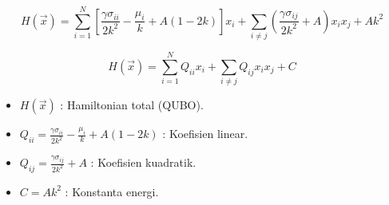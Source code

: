 \begin{equation}
    H(\vec{x}) = \sum_{i=1}^N \left[ \frac{\gamma \sigma_{ii}}{2k^2} - \frac{\mu_i}{k} + A(1 - 2k) \right] x_i + \sum_{i \ne j} \left( \frac{\gamma \sigma_{ij}}{2k^2} + A \right) x_i x_j + Ak^2
\end{equation}

\begin{equation}
    H(\vec{x}) = \sum_{i=1}^N Q_{ii} x_i + \sum_{i \ne j} Q_{ij} x_i x_j + C
\end{equation}

\begin{itemize}
    \item $H(\vec{x})$ : Hamiltonian total (QUBO).
    \item $Q_{ii} = \frac{\gamma \sigma_{ii}}{2k^2} - \frac{\mu_i}{k} + A(1 - 2k)$ : Koefisien linear.
    \item $Q_{ij} = \frac{\gamma \sigma_{ij}}{2k^2} + A$ : Koefisien kuadratik.
    \item $C = Ak^2$ : Konstanta energi.
\end{itemize}
